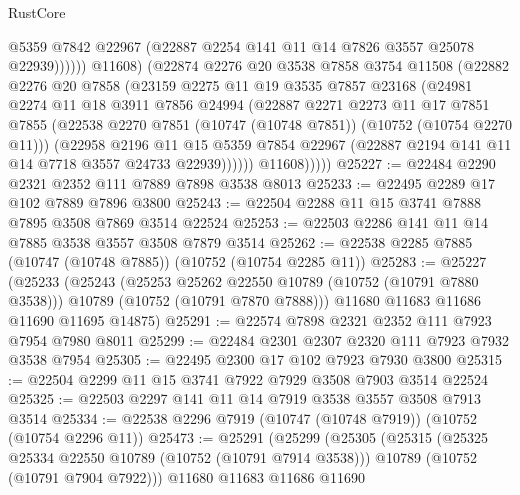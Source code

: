 \begin{lexlean}{RustCore}
\begin{coremodule}
                        @5359
                        @7842
                        @22967
                        (@22887 @2254 @141 @11 @14 @7826 @3557 @25078 @22939))))))
              @11608)
            (@22874
              @2276
              @20
              @3538
              @7858
              @3754
              @11508
              (@22882
                @2276
                @20
                @7858
                (@23159
                  @2275
                  @11
                  @19
                  @3535
                  @7857
                  @23168
                  (@24981
                    @2274
                    @11
                    @18
                    @3911
                    @7856
                    @24994
                    (@22887
                      @2271
                      @2273
                      @11
                      @17
                      @7851
                      @7855
                      (@22538 @2270 @7851 (@10747 (@10748 @7851)) (@10752 (@10754 @2270 @11)))
                      (@22958
                        @2196
                        @11
                        @15
                        @5359
                        @7854
                        @22967
                        (@22887 @2194 @141 @11 @14 @7718 @3557 @24733 @22939))))))
              @11608)))))
@25227 := @22484 @2290 @2321 @2352 @111 @7889 @7898 @3538 @8013
@25233 := @22495 @2289 @17 @102 @7889 @7896 @3800
@25243 := @22504 @2288 @11 @15 @3741 @7888 @7895 @3508 @7869 @3514 @22524
@25253 := @22503 @2286 @141 @11 @14 @7885 @3538 @3557 @3508 @7879 @3514
@25262 := @22538 @2285 @7885 (@10747 (@10748 @7885)) (@10752 (@10754 @2285 @11))
@25283 := @25227
    (@25233
      (@25243
        (@25253 @25262 @22550 @10789 (@10752 (@10791 @7880 @3538)))
        @10789
        (@10752 (@10791 @7870 @7888)))
      @11680
      @11683
      @11686
      @11690
      @11695
      @14875)
@25291 := @22574 @7898 @2321 @2352 @111 @7923 @7954 @7980 @8011
@25299 := @22484 @2301 @2307 @2320 @111 @7923 @7932 @3538 @7954
@25305 := @22495 @2300 @17 @102 @7923 @7930 @3800
@25315 := @22504 @2299 @11 @15 @3741 @7922 @7929 @3508 @7903 @3514 @22524
@25325 := @22503 @2297 @141 @11 @14 @7919 @3538 @3557 @3508 @7913 @3514
@25334 := @22538 @2296 @7919 (@10747 (@10748 @7919)) (@10752 (@10754 @2296 @11))
@25473 := @25291
    (@25299
      (@25305
        (@25315
          (@25325 @25334 @22550 @10789 (@10752 (@10791 @7914 @3538)))
          @10789
          (@10752 (@10791 @7904 @7922)))
        @11680
        @11683
        @11686
        @11690

\end{coremodule}
\end{lexlean}
